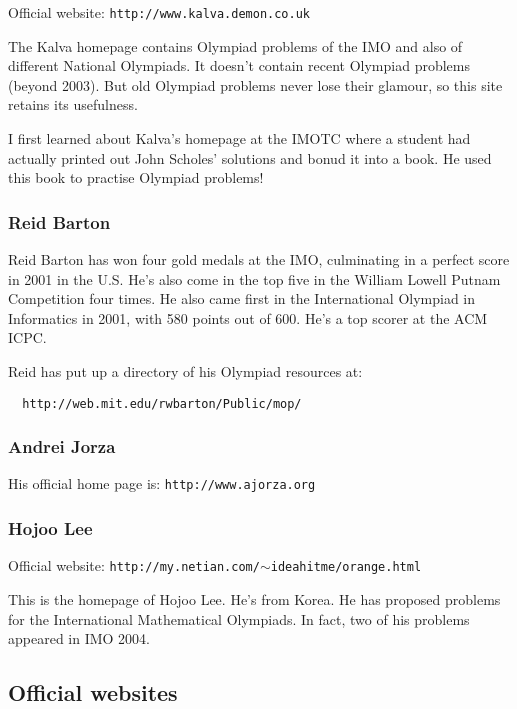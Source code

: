 \documentclass[a4paper]{amsart}
\begin{document}
Official website: {\tt http://www.kalva.demon.co.uk}

The Kalva homepage contains Olympiad problems of the IMO and also of different National Olympiads. It doesn't contain recent
Olympiad problems (beyond 2003). But old Olympiad problems never lose their glamour, so this site retains its usefulness.

I first learned about Kalva's homepage at the IMOTC where a student had actually printed out John Scholes' solutions and bonud it into
a book. He used this book to practise Olympiad problems!

\subsubsection{Reid Barton}

Reid Barton has won four gold medals at the IMO, culminating in a perfect score in 2001 in the U.S.  He's also come in the top
five in the William Lowell Putnam Competition four times. He also came first in the International Olympiad in Informatics in 2001,
with 580 points out of 600. He's a top scorer at the ACM ICPC.

Reid has put up a directory of his Olympiad resources at:

\begin{verbatim}
  http://web.mit.edu/rwbarton/Public/mop/
\end{verbatim}

\subsubsection{Andrei Jorza}

His official home page is: {\tt http://www.ajorza.org}

\subsubsection{Hojoo Lee}

Official website: {\tt http://my.netian.com/$\sim$ideahitme/orange.html}

This is the homepage of Hojoo Lee. He's from Korea. He has proposed problems for the International Mathematical Olympiads.
In fact, two of his problems appeared in IMO 2004.

\subsection{Official websites}
\end{document}
